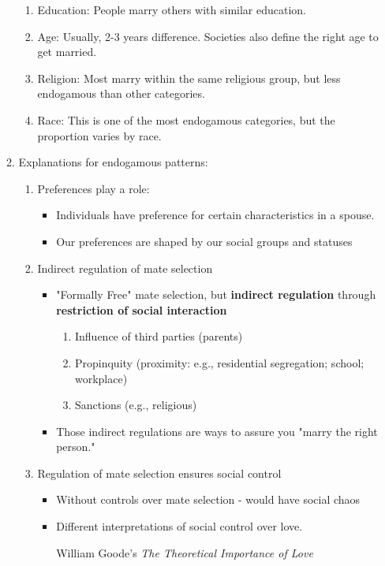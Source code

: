 \documentclass[12pt,a4paper]{article}
\begin{document}
\begin{enumerate}
\begin{enumerate}
\begin{enumerate}
			\item Education: People marry others with similar education.
			\item Age: Usually, 2-3 years difference. Societies also define the right age to get married. 
			\item Religion: Most marry within the same religious group, but less endogamous than other categories. 
			\item Race: This is one of the most endogamous categories, but the proportion varies by race. 
		\end{enumerate}
		\item Explanations for endogamous patterns: 
		\begin{enumerate}
			\item Preferences play a role: 
			\begin{itemize}
				\item Individuals have preference for certain characteristics in a spouse.
				\item Our preferences are shaped by our social groups and statuses
			\end{itemize}
			\item Indirect regulation of mate selection
			\begin{itemize}
				\item "Formally Free" mate selection, but \textbf{indirect regulation} through \textbf{restriction of social interaction}
				\begin{enumerate}
					\item Influence of third parties (parents)
					\item Propinquity (proximity: e.g., residential segregation; school; workplace)
					\item Sanctions (e.g., religious)
				\end{enumerate}
				\item Those indirect regulations are ways to assure you "marry the right person."
			\end{itemize}
			\item Regulation of mate selection ensures social control 
			\begin{itemize}
				\item Without controls over mate selection - would have social chaos
				\item Different interpretations of social control over love. 
				\begin{eg}{William Goode's \textit{The Theoretical Importance of Love}}
					\begin{enumerate}

\end{enumerate}
\end{eg}
\end{itemize}
\end{enumerate}
\end{enumerate}
\end{enumerate}
\end{document}
